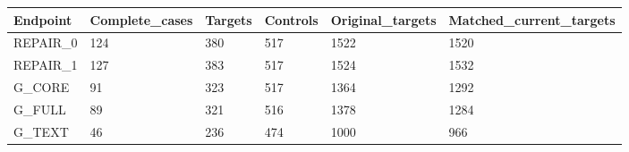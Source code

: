 \begin{tabular}{llllll}
Endpoint & Complete\_cases & Targets & Controls & Original\_targets & Matched\_current\_targets \\
\hline
REPAIR\_0 & 124 & 380 & 517 & 1522 & 1520 \\
REPAIR\_1 & 127 & 383 & 517 & 1524 & 1532 \\
G\_CORE & 91 & 323 & 517 & 1364 & 1292 \\
G\_FULL & 89 & 321 & 516 & 1378 & 1284 \\
G\_TEXT & 46 & 236 & 474 & 1000 & 966 \\
\end{tabular}

